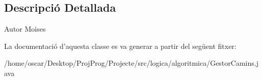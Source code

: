 \subsection{Descripció Detallada}
\begin{DoxyAuthor}{Autor}
Moises 
\end{DoxyAuthor}


La documentació d'aquesta classe es va generar a partir del següent fitxer\+:\begin{DoxyCompactItemize}
\item 
/home/oscar/\+Desktop/\+Proj\+Prog/\+Projecte/src/logica/algoritmica/Gestor\+Camins.\+java\end{DoxyCompactItemize}
